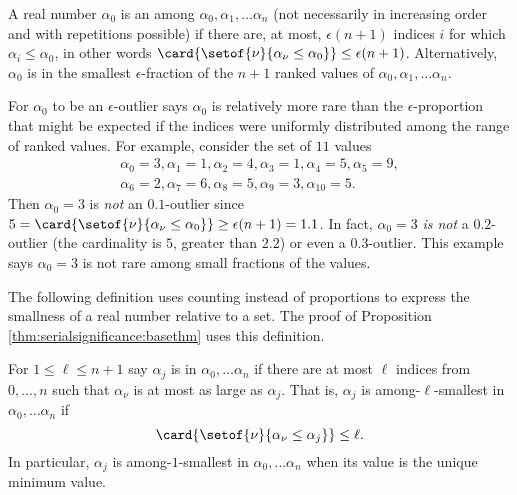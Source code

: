 \documentclass[12pt]{article}
\begin{document}
\begin{definition}
    A real number \( \alpha_0 \) is an %
    among \( \alpha_0, \alpha_1, \dots \alpha_n \) (not necessarily in
    increasing order and with repetitions possible) if there are, at
    most, \( \epsilon(n + 1) \) indices \( i \) for which \( \alpha_i
    \le \alpha_0 \), in other words \( \card{%
    \setof{\nu}{\alpha_{\nu} \le \alpha_0}} \le \epsilon(n+1) \).
    Alternatively, \( \alpha_0 \) is in the smallest \( \epsilon \)-fraction
    of the \( n + 1 \) ranked values of \( \alpha_0, \alpha_1, \dots
    \alpha_n \).
\end{definition}

\begin{remark}
    For \( \alpha_0 \) to be an \( \epsilon \)-outlier says \( \alpha_0 \)
    is relatively more rare than the \( \epsilon \)-proportion that
    might be expected if the indices were uniformly distributed among
    the range of ranked values.  For example, consider the set of \( 11 \)
    values
    \begin{multline*}
        \alpha_0 = 3, \alpha_1 = 1, \alpha_2 = 4, \alpha_3 = 1, \alpha_4
        = 5, \alpha_5 = 9, \\
        \alpha_6 = 2, \alpha_7 = 6, \alpha_8 = 5, \alpha_9 = 3, \alpha_{10}
        = 5.
    \end{multline*}
    Then \( \alpha_0 = 3 \) is \emph{not} an \( 0.1 \)-outlier since \(
    5 = \card{%
    \setof{\nu}{\alpha_\nu \le \alpha_0}} \ge \epsilon(n+1) = 1.1 \). In
    fact, \( \alpha_0 = 3 \) \emph{is not} a \( 0.2 \)-outlier (the
    cardinality is \( 5 \), greater than \( 2.2 \)) or even a \( 0.3 \)-outlier.
    This example says \( \alpha_0 = 3 \) is not rare among small
    fractions of the values.
\end{remark}

The following definition uses counting instead of proportions to express
the smallness of a real number relative to a set.  The proof of
Proposition~%
\ref{thm:serialsignificance:basethm} uses this definition.

\begin{definition}
    For \( 1 \le \ell \le n+1 \) say \( \alpha_j \) is %
    in \( \alpha_0, \dots \alpha_n \) if there are at most \( \ell \)
    indices from \( 0, \dots, n \) such that \( \alpha_{\nu} \) is at
    most as large as \( \alpha_j \).  That is, \( \alpha_j \) is among-\(
    \ell \)-smallest in \( \alpha_0, \dots \alpha_n \) if
    \[
        \card{ \setof{\nu}{\alpha_{\nu} \le \alpha_j}} \le \ell.
    \] In particular, \( \alpha_j \) is among-\( 1 \)-smallest in \(
    \alpha_0, \dots \alpha_n \) when its value is the unique minimum
    value.
\end{definition}
\end{document}
